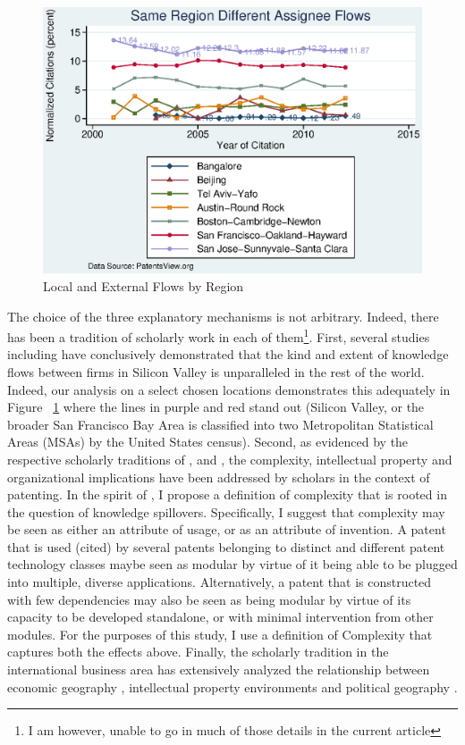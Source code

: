 \documentclass[12pt]{article}
\begin{document}
\\\\
\begin{figure}[h]
\begin{centering}
  \includegraphics[width=\textwidth]{SameRegionDiffAssigneeFlows}
  \caption{Local and External Flows by Region}
  \label{fig:SameRegionDiffAssigneeFlows}
\end{centering}
\end{figure}
The choice of the three explanatory mechanisms is not arbitrary. Indeed, there has been a tradition of scholarly work in each of them\footnote{I am however, unable to go in much of those details in the current article}. First, several studies including \cite{Almeida1999} have conclusively demonstrated that the kind and extent of knowledge flows between firms in Silicon Valley is unparalleled in the rest of the world. Indeed, our analysis on a select chosen locations demonstrates this adequately in Figure ~\ref{fig:SameRegionDiffAssigneeFlows} where the lines in purple and red stand out (Silicon Valley, or the broader San Francisco Bay Area is classified into two Metropolitan Statistical Areas (MSAs) by the United States census). Second, as evidenced by the respective scholarly traditions of \cite{Baldwin2015}, \cite{Ethiraj2004b}  and \cite{Yayavaram2008}, the complexity, intellectual property and organizational implications have been addressed by scholars in the context of patenting. In the spirit of \cite{Ethiraj2004b}, I propose a definition of complexity that is rooted in the question of knowledge spillovers. Specifically, I suggest that complexity may be seen as either an attribute of usage, or as an attribute of invention. A patent that is used (cited) by several patents belonging to distinct and different patent technology classes maybe seen as modular by virtue of it being able to be plugged into multiple, diverse applications. Alternatively, a patent that is constructed with few dependencies may also be seen as being modular by virtue of its capacity to be developed standalone, or with minimal intervention from other modules. For the purposes of this study, I use a definition of Complexity that captures both the effects above. Finally, the scholarly tradition in the international business area has extensively analyzed the relationship between economic geography \cite{Singh2007}, intellectual property environments \citep{Zhao2006} and political geography \citep{Singh2013}.
\end{document}
